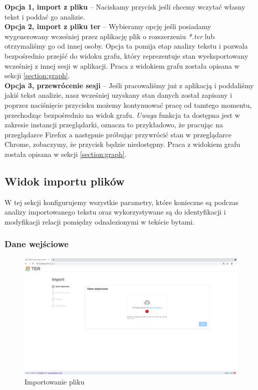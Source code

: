 \documentclass[12pt, a4paper]{article}
\begin{document}
\textbf{Opcja 1, import z pliku} -- Naciskamy przycisk jeśli chcemy wczytać własny tekst i poddać go analizie.\\

\noindent\textbf{Opcja 2, import z pliku ter} -- Wybieramy opcję jeśli posiadamy wygenerowany wcześniej przez aplikację plik o rozszerzeniu \textit{*.ter} lub otrzymaliśmy go od innej osoby. Opcja ta pomija etap analizy tekstu i pozwala bezpośrednio przejść do widoku grafu, który reprezentuje stan wyeksportowany wcześniej z innej sesji w aplikacji. Praca z widokiem grafu została opisana w sekcji \ref{section:graph}.\\

\noindent\textbf{Opcja 3, przewrócenie sesji} -- Jeśli pracowaliśmy już z aplikacją i poddaliśmy jakiś tekst analizie, nasz wcześniej uzyskany stan danych został zapisany i poprzez naciśnięcie przycisku możemy kontynuować pracę od tamtego momentu, przechodząc bezpośrednio na widok grafu. \textit{Uwaga} funkcja ta dostępna jest w zakresie instancji przeglądarki, oznacza to przykładowo, że pracując na przeglądarce Firefox a następnie próbując przywrócić stan w przeglądarce Chrome, zobaczymy, że przycisk będzie niedostępny. Praca z widokiem grafu została opisana w sekcji \ref{section:graph}.

\pagebreak

\subsection{Widok importu plików}

W tej sekcji konfigurujemy wszystkie parametry, które konieczne są podczas analizy importowanego tekstu oraz wykorzystywane są do identyfikacji i modyfikacji relacji pomiędzy odnalezionymi w tekście bytami.

\subsubsection{Dane wejściowe}

\begin{figure}[H]
    \centering
    \includegraphics[width=\linewidth]{images/import-before-file.png}
    \caption{Importowanie pliku}
\end{figure}
\end{document}
